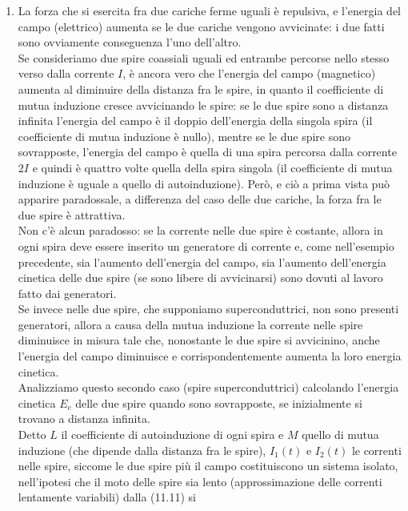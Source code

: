 \begin{enumerate}
  \item La forza che si esercita fra due cariche ferme uguali \`e repulsiva, e
    l'energia del campo (elettrico) aumenta se le due cariche vengono
    avvicinate: i due fatti sono ovviamente conseguenza l'uno dell'altro.\\
    Se consideriamo due spire coassiali uguali ed entrambe percorse nello stesso
    verso dalla corrente $I$, \`e ancora vero che l'energia del campo
    (magnetico) aumenta al diminuire della distanza fra le spire, in quanto il
    coefficiente di mutua induzione cresce avvicinando le spire: se le due spire
    sono a distanza infinita l'energia del campo \`e il doppio dell'energia
    della singola spira (il coefficiente di mutua induzione \`e nullo), mentre
    se le due spire sono sovrapposte, l'energia del campo \`e quella di una
    spira percorsa dalla corrente $2I$ e quindi \`e quattro volte quella della
    spira singola (il coefficiente di mutua induzione \`e uguale a quello di
    autoinduzione). Per\`o, e
    ci\`o a prima vista pu\`o apparire paradossale, a differenza del caso delle
    due cariche, la forza fra le due spire \`e attrattiva.\\
    Non c'\`e alcun paradosso: se la corrente nelle due spire \`e costante,
    allora in ogni spira deve essere inserito un generatore di corrente e, come
    nell'esempio precedente, sia l'aumento dell'energia del campo, sia l'aumento
    dell'energia cinetica delle due spire (se sono libere di avvicinarsi) sono
    dovuti al lavoro fatto dai generatori.\\
    Se invece nelle due spire, che supponiamo superconduttrici, non sono
    presenti generatori, allora a causa della mutua induzione la corrente nelle
    spire diminuisce in misura tale che, nonostante le due spire si avvicinino,
    anche l'energia del campo diminuisce e corrispondentemente aumenta la loro
    energia cinetica.\\
    Analizziamo questo secondo caso (spire superconduttrici) calcolando
    l'energia cinetica $E_c$ delle due spire quando sono sovrapposte, se
    inizialmente si trovano a distanza infinita.\\
    Detto $L$ il coefficiente di autoinduzione di ogni spira e $M$ quello di
    mutua induzione (che dipende dalla distanza fra le spire), $I_1(t)$ e
    $I_2(t)$ le correnti nelle spire, siccome le due spire pi\`u il campo
    costituiscono un sistema isolato, nell'ipotesi che il moto delle spire sia
    lento (approssimazione delle correnti lentamente variabili) dalla (11.11) si

\end{enumerate}
